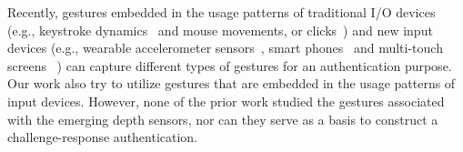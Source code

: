 Recently, gestures embedded in the usage patterns of traditional I/O devices (e.g., keystroke dynamics~\cite{Revett:springerlink:10,Monrose:CCS99} and mouse movements, or clicks~\cite{Ahmed:TPDS07,Jorgensen11mouse}) and new input devices (e.g., wearable accelerometer sensors~\cite{Gafurov2007},  smart phones~\cite{Uell:CCS13, Derawi:2013} and multi-touch screens~\cite{SaeBaeCHI2012,Sherman:2014} ) can capture different types of gestures for an authentication purpose. %
Our work also try to utilize gestures that are embedded in the usage patterns of input devices. However, none of the prior work studied the gestures associated with the emerging depth sensors, nor can they serve as a basis to construct a challenge-response authentication.



